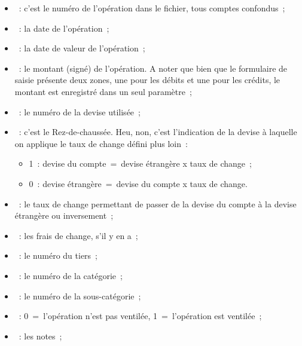 \begin{itemize}

\item {}~: c'est le numéro de l'opération dans le fichier, tous comptes
confondus~;

\item {}~: la date de l'opération~;

\item {}~: la date de valeur de l'opération~;

\item {}~: le montant (signé) de l'opération. A noter que bien que le 
formulaire de saisie présente deux zones, une pour les débits et une pour les 
crédits, le montant est enregistré dans un seul paramètre~;

\item {}~: le numéro de la devise utilisée~;

\item {}~: c'est le Rez-de-chaussée. Heu, non, c'est l'indication de la 
devise à laquelle on applique le taux de change défini plus loin~:

\begin{itemize}

\item 1~: devise du compte~=~devise étrangère x taux de change~;

\item 0~: devise étrangère~=~devise du compte  x taux de change.

\end{itemize}

\item {}~: le taux de change permettant de passer de la devise du compte 
à la devise étrangère ou inversement~;

\item {}~: les frais de change, s'il y en a~;

\item {}~: le numéro du tiers~;

\item {}~: le numéro de la catégorie~;

\item {}~: le numéro de la sous-catégorie~;

\item {}~: 0~=~l'opération n'est pas ventilée, 1~=~l'opération est
ventilée~;

\item {}~: les notes~;


\end{itemize}
